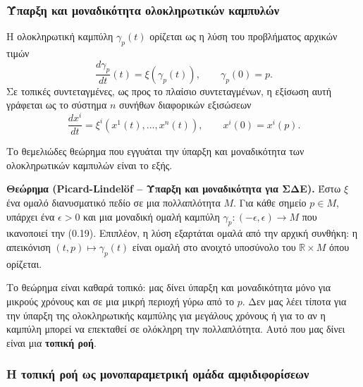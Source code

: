 \documentclass[12pt]{article}
\begin{document}
\subsubsection{Ύπαρξη και μοναδικότητα ολοκληρωτικών καμπυλών}

Η ολοκληρωτική καμπύλη $\gamma_p(t)$ ορίζεται ως η λύση του προβλήματος αρχικών τιμών
\[
\frac{d\gamma_p}{dt}(t) = \xi(\gamma_p(t)), \qquad \gamma_p(0) = p. \tag{0.19}
\]
Σε τοπικές συντεταγμένες, ως προς το πλαίσιο συντεταγμένων, η εξίσωση αυτή γράφεται ως το σύστημα $n$ συνήθων διαφορικών εξισώσεων
\[
\frac{dx^i}{dt} = \xi^i(x^1(t), \dots, x^n(t)), \qquad x^i(0) = x^i(p). \tag{0.20}
\]

Το θεμελιώδες θεώρημα που εγγυάται την ύπαρξη και μοναδικότητα των ολοκληρωτικών καμπυλών είναι το εξής.

\textbf{Θεώρημα (Picard-Lindelöf – Ύπαρξη και μοναδικότητα για ΣΔΕ).} Έστω $\xi$ ένα ομαλό διανυσματικό πεδίο σε μια πολλαπλότητα $M$. Για κάθε σημείο $p \in M$, υπάρχει ένα $\epsilon > 0$ και μια μοναδική ομαλή καμπύλη $\gamma_p: (-\epsilon, \epsilon) \to M$ που ικανοποιεί την (0.19). Επιπλέον, η λύση εξαρτάται ομαλά από την αρχική συνθήκη: η απεικόνιση $(t, p) \mapsto \gamma_p(t)$ είναι ομαλή στο ανοιχτό υποσύνολο του $\mathbb{R} \times M$ όπου ορίζεται.

Το θεώρημα είναι καθαρά τοπικό: μας δίνει ύπαρξη και μοναδικότητα μόνο για μικρούς χρόνους και σε μια μικρή περιοχή γύρω από το $p$. Δεν μας λέει τίποτα για την ύπαρξη της ολοκληρωτικής καμπύλης για μεγάλους χρόνους ή για το αν η καμπύλη μπορεί να επεκταθεί σε ολόκληρη την πολλαπλότητα. Αυτό που μας δίνει είναι μια \textbf{τοπική ροή}.

\subsubsection{Η τοπική ροή ως μονοπαραμετρική ομάδα αμφιδιφορίσεων}
\end{document}
